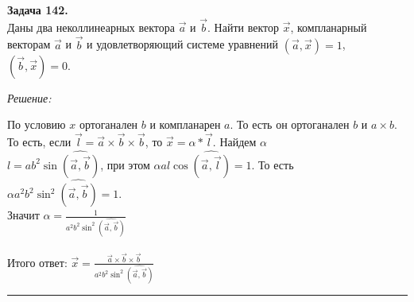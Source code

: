 \documentclass[a4paper, 12pt]{article}
\newenvironment{problem}[2][Задача]
    { \begin{mdframed}[backgroundcolor=gray!10] \textbf{#1 #2.} \\}
    {  \end{mdframed}}
\newenvironment{solution}
    {\textit{Решение: }}
    {\noindent\rule{7in}{1.5pt}}
\begin{document}
\begin{problem}{142}
Даны два неколлинеарных вектора $\vec a$ и $\vec b$. Найти вектор $\vec x$, компланарный векторам $\vec a$ и $\vec b$ и
удовлетворяющий системе уравнений $(\vec{a},\vec{x})=1$, $(\vec{b},\vec{x})=0$.
\end{problem}
\begin{solution}

По условию $x$ ортоганален $b$ и компланарен $a$. То есть он ортоганален $b$ и $a \times b$. \\
То есть, если $\overrightarrow{l}=\overrightarrow{a} \times \overrightarrow{b} \times \overrightarrow{b}$, то $\overrightarrow{x} = \alpha * \overrightarrow{l}$. Найдем $\alpha$ \\
$l=ab^2\sin{\hat{(\overrightarrow{a}, \overrightarrow{b})}}$, при этом
$\alpha al\cos{\hat{(\overrightarrow{a}, \overrightarrow{l})}} = 1$. То есть
$\alpha a^2 b^2 \sin^2{\hat{(\overrightarrow{a}, \overrightarrow{b})}} = 1$. \\
Значит
$\alpha = \frac{1}{a^2 b^2 \sin^2{\hat{(\overrightarrow{a}, \overrightarrow{b})}}}$
\\
\\
Итого ответ: $\overrightarrow{x} = \frac{\overrightarrow{a} \times \overrightarrow{b} \times \overrightarrow{b}}{a^2 b^2 \sin^2{\hat{(\overrightarrow{a}, \overrightarrow{b})}}}$

\end{solution}
\end{document}
